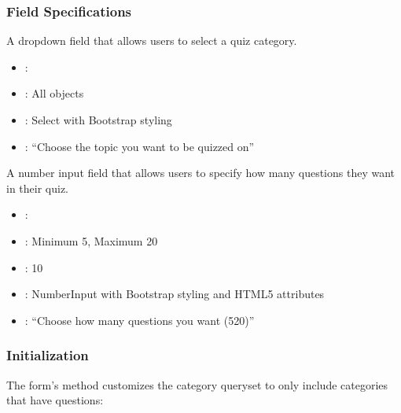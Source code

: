 \documentclass[letterpaper,10pt,english]{sphinxmanual}
\begin{document}
\subsubsection{Field Specifications}
\label{\detokenize{forms:field-specifications}}\begin{description}
\sphinxAtStartPar
A dropdown field that allows users to select a quiz category.
\begin{itemize}
\item {} 
\sphinxAtStartPar
{}: 

\item {} 
\sphinxAtStartPar
{}: All  objects

\item {} 
\sphinxAtStartPar
{}: Select with Bootstrap styling

\item {} 
\sphinxAtStartPar
{}: “Choose the topic you want to be quizzed on”

\end{itemize}

\sphinxAtStartPar
A number input field that allows users to specify how many questions they want in their quiz.
\begin{itemize}
\item {} 
\sphinxAtStartPar
{}: 

\item {} 
\sphinxAtStartPar
{}: Minimum 5, Maximum 20

\item {} 
\sphinxAtStartPar
{}: 10

\item {} 
\sphinxAtStartPar
{}: NumberInput with Bootstrap styling and HTML5 attributes

\item {} 
\sphinxAtStartPar
{}: “Choose how many questions you want (5\sphinxhyphen{}20)”

\end{itemize}

\end{description}


\subsubsection{Initialization}
\label{\detokenize{forms:initialization}}
\sphinxAtStartPar
The form’s  method customizes the category queryset to only include categories that have questions:
\end{document}
